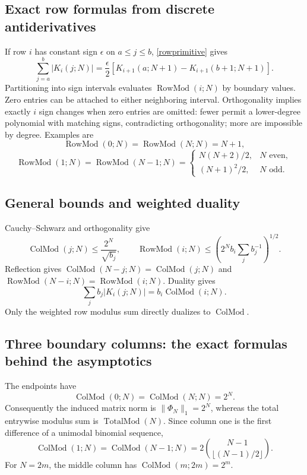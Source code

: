 \documentclass[11pt,reqno]{amsart}
\theoremstyle{remark}\newtheorem{remark}[theorem]{Remark}
\DeclareMathOperator{\RowMod}{RowMod}
\DeclareMathOperator{\ColMod}{ColMod}
\DeclareMathOperator{\TotalMod}{TotalMod}
\begin{document}
\subsection{Exact row formulas from discrete antiderivatives}
If row $i$ has constant sign $\epsilon$ on $a\le j\le b$, \eqref{rowprimitive} gives
\begin{equation}\label{absrow}
\sum_{j=a}^b|K_i(j;N)|=\frac\epsilon2
[K_{i+1}(a;N+1)-K_{i+1}(b+1;N+1)].
\end{equation}
Partitioning into sign intervals evaluates $\RowMod(i;N)$ by boundary values. Zero entries can be attached to either neighboring interval. Orthogonality implies exactly $i$ sign changes when zero entries are omitted: fewer permit a lower-degree polynomial with matching signs, contradicting orthogonality; more are impossible by degree.
Examples are
\[
\RowMod(0;N)=\RowMod(N;N)=N+1,
\]
\[
\RowMod(1;N)=\RowMod(N-1;N)=
\begin{cases}N(N+2)/2,&N\text{ even},\\(N+1)^2/2,&N\text{ odd}.
\end{cases}
\]

\subsection{General bounds and weighted duality}
Cauchy--Schwarz and orthogonality give
\begin{equation}\label{absbounds}
\ColMod(j;N)\le\frac{2^N}{\sqrt{b_j}},\qquad
\RowMod(i;N)\le\left(2^Nb_i\sum_j b_j^{-1}\right)^{1/2}.
\end{equation}
Reflection gives $\ColMod(N-j;N)=\ColMod(j;N)$ and $\RowMod(N-i;N)=\RowMod(i;N)$. Duality gives
\[
\sum_jb_j|K_i(j;N)|=b_i\ColMod(i;N).
\]
Only the weighted row modulus sum directly dualizes to $\ColMod$.

\subsection{Three boundary columns: the exact formulas behind the asymptotics}
The endpoints have
\[
\ColMod(0;N)=\ColMod(N;N)=2^N.
\]
Consequently the induced matrix norm is $\|\Phi_N\|_1=2^N$, whereas the total entrywise modulus sum is $\TotalMod(N)$.
Since column one is the first difference of a unimodal binomial sequence,
\begin{equation}\label{C1}
\ColMod(1;N)=\ColMod(N-1;N)=2\binom{N-1}{\lfloor(N-1)/2\rfloor}.
\end{equation}
For $N=2m$, the middle column has $\ColMod(m;2m)=2^m$.
\end{document}
